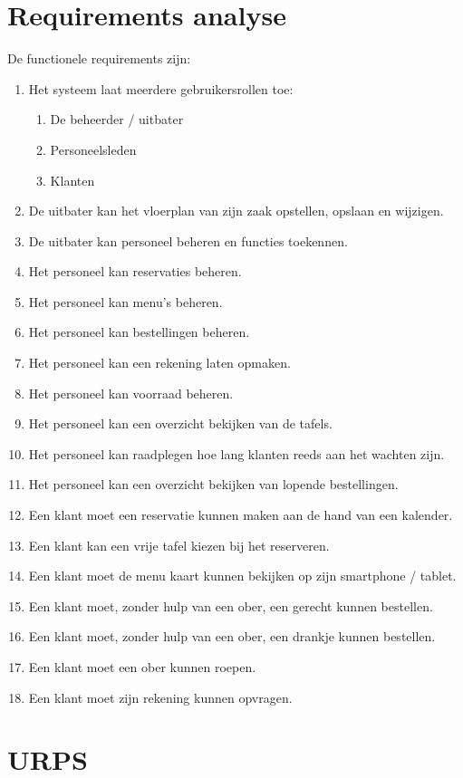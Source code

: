 \documentclass[a4paper]{article}
\begin{document}
\section{Requirements analyse} 
De functionele requirements zijn:
\begin{enumerate}
\item Het systeem laat meerdere gebruikersrollen toe:
\begin{enumerate}
\item De beheerder / uitbater
\item Personeelsleden
\item Klanten
\end{enumerate}
\item De uitbater kan het vloerplan van zijn zaak opstellen, opslaan en wijzigen.
\item De uitbater kan personeel beheren en functies toekennen.
\item Het personeel kan reservaties beheren.
\item Het personeel kan menu's beheren.
\item Het personeel kan bestellingen beheren.
\item Het personeel kan een rekening laten opmaken.
\item Het personeel kan voorraad beheren.
\item Het personeel kan een overzicht bekijken van de tafels.
\item Het personeel kan raadplegen hoe lang klanten reeds aan het wachten zijn.
\item Het personeel kan een overzicht bekijken van lopende bestellingen.
\item Een klant moet een reservatie kunnen maken aan de hand van een kalender.
\item Een klant kan een vrije tafel kiezen bij het reserveren.
\item Een klant moet de menu kaart kunnen bekijken op zijn smartphone / tablet.
\item Een klant moet, zonder hulp van een ober, een gerecht kunnen bestellen.
\item Een klant moet, zonder hulp van een ober, een drankje kunnen bestellen.
\item Een klant moet een ober kunnen roepen.
\item Een klant moet zijn rekening kunnen opvragen.
\end{enumerate}
\section{URPS} 
\end{document}
